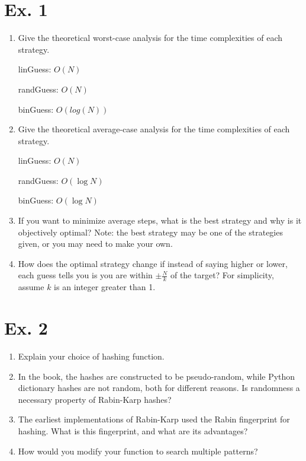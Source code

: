 \documentclass{article}
\begin{document}
\section{Ex. 1}
\begin{enumerate}
    \item Give the theoretical worst-case analysis for the time complexities of each strategy.
    
    linGuess: $O(N)$
    
    randGuess: $O(N)$
    
    binGuess: $O(log(N))$
    
    \item Give the theoretical average-case analysis for the time complexities of each strategy.
    
    linGuess: $O(N)$

    randGuess: $O(\log N)$

    binGuess: $O(\log N)$
    
    \item If you want to minimize average steps, what is the best strategy and why is it objectively optimal? Note: the best strategy may be one of the strategies given, or you may need to make your own.
    


    \item How does the optimal strategy change if instead of saying higher or lower, each guess tells you is you are within $\pm \frac{N}{k}$ of the target? For simplicity, assume $k$ is an integer greater than 1.


    
\end{enumerate}

\section{Ex. 2}
\begin{enumerate}
    \item Explain your choice of hashing function.  
    
    
    
    \item In the book, the hashes are constructed to be pseudo-random, while Python dictionary hashes are not random, both for different reasons. Is randomness a necessary property of Rabin-Karp hashes?
    
    
    
    \item The earliest implementations of Rabin-Karp used the Rabin fingerprint for hashing. What is this fingerprint, and what are its advantages?  
    
    
    
    \item How would you modify your function to search multiple patterns? 



\end{enumerate}
\end{document}
